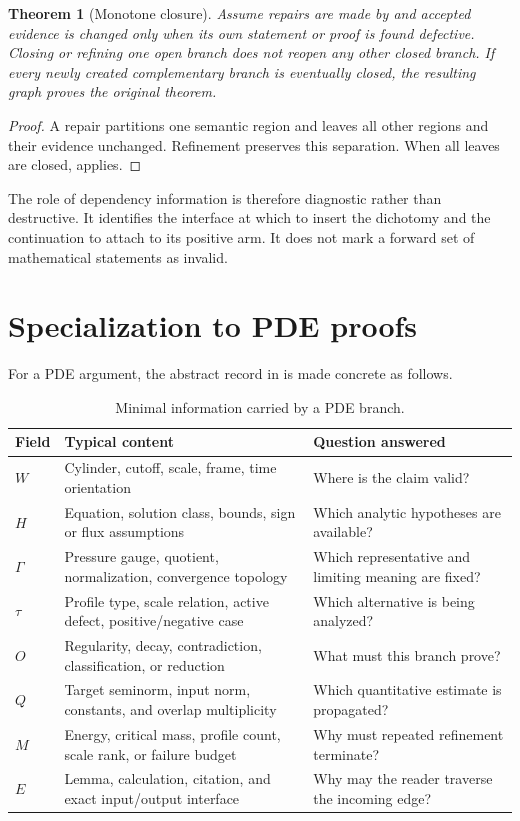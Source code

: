 \documentclass[11pt,reqno]{amsart}
\theoremstyle{plain}
\newtheorem{theorem}{Theorem}[section]
\theoremstyle{definition}
\theoremstyle{remark}
\numberwithin{equation}{section}
\begin{document}
\begin{theorem}[Monotone closure]\label{thm:monotone}
Assume repairs are made by  and accepted evidence is changed
only when its own statement or proof is found defective.  Closing or refining
one open branch does not reopen any other closed branch.  If every newly
created complementary branch is eventually closed, the resulting graph proves
the original theorem.
\end{theorem}

\begin{proof}
A repair partitions one semantic region and leaves all other regions and their
evidence unchanged.  Refinement preserves this separation.  When all leaves
are closed,  applies.
\end{proof}

The role of dependency information is therefore diagnostic rather than
destructive.  It identifies the interface at which to insert the dichotomy and
the continuation to attach to its positive arm.  It does not mark a forward
set of mathematical statements as invalid.

\section{Specialization to PDE proofs}
\label{sec:pde-specialization}

For a PDE argument, the abstract record in  is made
concrete as follows.

\begin{table}[H]
\caption{Minimal information carried by a PDE branch.}
\label{tab:pde-state}
\centering
\small
\begin{tabularx}{\textwidth}{@{}L{0.16\textwidth}Y Y@{}}
\toprule
Field & Typical content & Question answered \\
\midrule
\(W\) & Cylinder, cutoff, scale, frame, time orientation & Where is the claim valid? \\
\(H\) & Equation, solution class, bounds, sign or flux assumptions & Which analytic hypotheses are available? \\
\(\Gamma\) & Pressure gauge, quotient, normalization, convergence topology & Which representative and limiting meaning are fixed? \\
\(\tau\) & Profile type, scale relation, active defect, positive/negative case & Which alternative is being analyzed? \\
\(O\) & Regularity, decay, contradiction, classification, or reduction & What must this branch prove? \\
\(Q\) & Target seminorm, input norm, constants, and overlap multiplicity & Which quantitative estimate is propagated? \\
\(M\) & Energy, critical mass, profile count, scale rank, or failure budget & Why must repeated refinement terminate? \\
\(E\) & Lemma, calculation, citation, and exact input/output interface & Why may the reader traverse the incoming edge? \\
\bottomrule
\end{tabularx}
\end{table}
\end{document}
